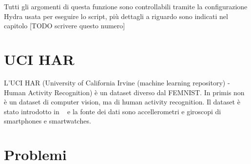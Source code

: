 Tutti gli argomenti di questa funzione sono controllabili tramite la
configurazione Hydra usata per eseguire lo script, più dettagli a riguardo
sono indicati nel capitolo [TODO scrivere questo numero]


\section{UCI HAR}
L'UCI HAR (University of California Irvine (machine learning repository) -
Human Activity Recognition) è un dataset diverso dal FEMNIST. In primis
non è un dataset di computer vision, ma di human activity recognition.
Il dataset è stato introdotto in ~\cite{Anguita2013APD} e la fonte dei
dati sono accellerometri e giroscopi di smartphones e smartwatches.


\section{Problemi}
